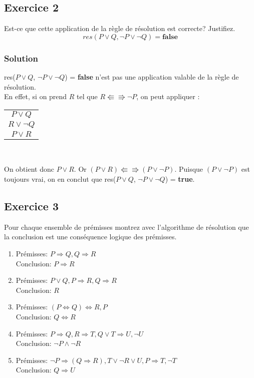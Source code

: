 \subsection*{Exercice 2}
Est-ce que cette application de la règle de résolution est correcte? Justifiez.
$$
res(P \vee Q, \neg P \vee \neg Q) = \textbf{false}
$$

    \subsubsection*{Solution}

res($P \lor Q$, $\neg P \lor \neg Q$) = \textbf{false} n'est pas une application valable de la règle de résolution.\\
En effet, si on prend $R$ tel que $R \Lleftarrow\!\!\!\!\Rrightarrow \neg P$, on peut appliquer :
\begin{center}
\begin{tabular}{c}
$P \lor Q$ \\
$R \lor \neg Q$\\
\hline
$P \lor R$\\
\end{tabular}\\
\end{center}
On obtient donc $P \lor R$.
Or $(P \lor R) \Lleftarrow\!\!\!\!\Rrightarrow (P \lor \neg P)$.
Puisque $(P \lor \neg P)$ est toujours vrai, on en conclut que res($P \lor Q$, $\neg P \lor \neg Q$) = \textbf{true}.

\subsection*{Exercice 3}
Pour chaque ensemble de prémisses montrez avec l'algorithme de résolution que la conclusion est une conséquence logique des prémisses.
\begin{enumerate}
 \item
 Prémisses: $P \Rightarrow Q, Q \Rightarrow R$ \\
 Conclusion: $P \Rightarrow R$
 \item
 Prémisses: $P \vee Q, P \Rightarrow R, Q \Rightarrow R$ \\
 Conclusion: $R$
 \item
 Prémisses: $(P \Leftrightarrow Q) \Leftrightarrow R, P$ \\
 Conclusion: $Q \Leftrightarrow R$
 \item
 Prémisses: $P \Rightarrow Q, R \Rightarrow T, Q \vee T \Rightarrow U, \neg U$ \\
 Conclusion: $\neg P \wedge \neg R$
 \item
 Prémisses: $\neg P \Rightarrow (Q \Rightarrow R), T \vee \neg R \vee U, P \Rightarrow T, \neg T$ \\
 Conclusion: $Q \Rightarrow U$
\end{enumerate}

